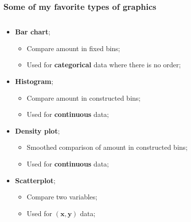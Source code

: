 \documentclass[aspectratio=169]{beamer}
\theoremstyle{principle}
\begin{document}
\begin{frame}
\frametitle{Some of my favorite types of graphics}


\begin{columns}
\begin{column}{0.5\textwidth}

\begin{itemize}
\item \textbf{Bar chart};
\begin{itemize}
\item Compare amount in fixed bins;
\item Used for \textbf{categorical} data where there is no order;
\end{itemize}


\item \textbf{Histogram};
\begin{itemize}
\item Compare amount in constructed bins;
\item Used for \textbf{continuous} data;
\end{itemize}


\item \textbf{Density plot};
\begin{itemize}
\item Smoothed comparison of amount in constructed bins;
\item Used for \textbf{continuous} data;
\end{itemize}


\item \textbf{Scatterplot};
\begin{itemize}
\item Compare two variables;
\item Used for $\mathbf{(x,y)}$ data;
\end{itemize}

\end{itemize}

\end{column}


\end{columns}
\end{frame}
\end{document}
